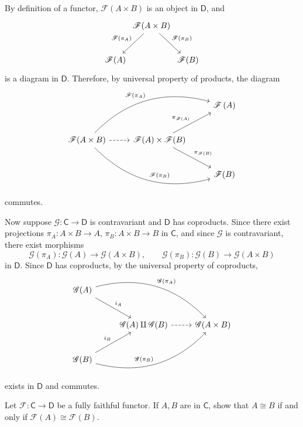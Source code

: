 \documentclass[11pt]{report}
\begin{document}
\begin{solution}
	By definition of a functor, $\mathscr{F} (A\times B)$ is an object in $\mathsf{D} $, and
	\[\begin{tikzcd}[row sep = 2.5em, column sep = 0em]
		&\mathscr{F} (A\times B)\arrow[dr, "\mathscr{F} (\pi_B)"]\arrow[dl, "\mathscr{F} (\pi_A)"']\\
		\mathscr{F} (A)&&\mathscr{F} (B)
	\end{tikzcd}\]
	is a diagram in $\mathsf{D} $. Therefore, by universal property of products, the diagram
	\[\begin{tikzcd}[row sep = 2.5em, column sep = 2.5em]
		&&\mathscr{F} \left( A \right) \\
		\mathscr{F} (A\times B)\arrow[urr, bend left, "\mathscr{F} (\pi_A)"]\arrow[drr, bend right, "\mathscr{F} (\pi _B)"]\arrow[r, dashed]&\mathscr{F} (A)\times \mathscr{F} (B)\arrow[ur, "\pi_{\mathscr{F} (A)} "]\arrow[dr,"\pi_{\mathscr{F} (B)} "]\\
																		    &&\mathscr{F} (B)
	\end{tikzcd}\]
	commutes.

	Now suppose $\mathscr{G} : \mathsf{C}  \to \mathsf{D} $ is contravariant and $\mathsf{D} $ has coproducts. Since there exist projections $\pi_A: A\times B \to A$, $\pi_B : A\times B \to B$ in $\mathsf{C} $, and since $\mathscr{G} $ is contravariant, there exist morphisms
	\[
		\mathscr{G} (\pi_A): \mathscr{G} (A)\to \mathscr{G} (A\times B),\qquad \mathscr{G} (\pi_B): \mathscr{G} (B) \to \mathscr{G} (A\times B)
	\]
	in $\mathsf{D} $. Since $\mathsf{D} $ has coproducts, by the universal property of coproducts,
	\[\begin{tikzcd}[row sep = 2.5em, column sep = 2.5em]
		\mathscr{G} (A)\arrow[dr, "i_A"]\arrow[drr, bend left, "\mathscr{G} (\pi_A)"]\\
		&\mathscr{G} (A)\amalg \mathscr{G} (B)\arrow[r, dashed]&\mathscr{G} (A\times B)\\
		\mathscr{G} (B)\arrow[ur, "i_B"]\arrow[urr, bend right, "\mathscr{G} (\pi_B)"]
	\end{tikzcd}\]
	exists in $\mathsf{D} $ and commutes.
\end{solution}
\begin{exercise}
	Let $\mathscr{F} : \mathsf{C}  \to \mathsf{D} $ be a fully faithful functor. If $A,B$ are in $\mathsf{C} $, show that $A\cong B$ if and only if $\mathscr{F} (A)\cong \mathscr{F} (B)$.
\end{exercise}
\end{document}
